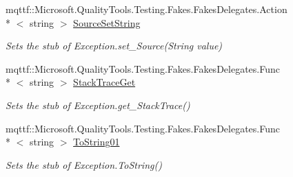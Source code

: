 \begin{DoxyCompactItemize}
mqttf\-::\-Microsoft.\-Quality\-Tools.\-Testing.\-Fakes.\-Fakes\-Delegates.\-Action\\*
$<$ string $>$ \hyperlink{class_system_1_1_fakes_1_1_stub_argument_out_of_range_exception_a018adc1df6c65f83bef264d9b434ed22}{Source\-Set\-String}
\begin{DoxyCompactList}\small\item\em Sets the stub of Exception.\-set\-\_\-\-Source(\-String value)\end{DoxyCompactList}\item 
mqttf\-::\-Microsoft.\-Quality\-Tools.\-Testing.\-Fakes.\-Fakes\-Delegates.\-Func\\*
$<$ string $>$ \hyperlink{class_system_1_1_fakes_1_1_stub_argument_out_of_range_exception_acba11e0880f2c1d8171bf96921c57690}{Stack\-Trace\-Get}
\begin{DoxyCompactList}\small\item\em Sets the stub of Exception.\-get\-\_\-\-Stack\-Trace()\end{DoxyCompactList}\item 
mqttf\-::\-Microsoft.\-Quality\-Tools.\-Testing.\-Fakes.\-Fakes\-Delegates.\-Func\\*
$<$ string $>$ \hyperlink{class_system_1_1_fakes_1_1_stub_argument_out_of_range_exception_afdece98f73c24949a7a3c497a88f2e2a}{To\-String01}
\begin{DoxyCompactList}\small\item\em Sets the stub of Exception.\-To\-String()\end{DoxyCompactList}\end{DoxyCompactItemize}
